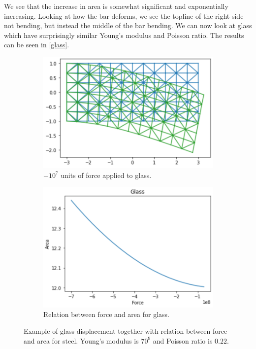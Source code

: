 We see that the increase in area is somewhat significant and exponentially increasing. Looking at how the bar deforms, we see the topline of the right side not bending, but instead the middle of the bar bending. We can now look at glass which have surprisingly similar Young's modulus and Poisson ratio. The results can be seen in \autoref{glass}.
\begin{figure}[H]
	\centering
	\begin{subfigure}[b]{0.49\linewidth}
		\centering
		\includegraphics[width=\linewidth]{Materials/Glassviz}
		\caption{$-10^7$ units of force applied to glass.}
	\end{subfigure}
	\hfill
	\begin{subfigure}[b]{0.49\linewidth}
		\centering
		\includegraphics[width=\linewidth]{Materials/GlassArea}
		\caption{Relation between force and area for glass.}
	\end{subfigure}
	\caption{Example of glass displacement together with relation between force and area for steel. Young's modulus is $70^9$ and Poisson ratio is $0.22$.}
	\label{glass}
\end{figure}
